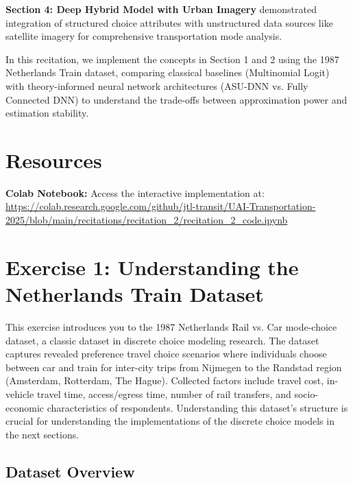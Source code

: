 \documentclass[11pt]{article}
\begin{document}
\textbf{Section 4: Deep Hybrid Model with Urban Imagery} demonstrated integration of structured choice attributes with unstructured data sources like satellite imagery for comprehensive transportation mode analysis.

In this recitation, we implement the concepts in Section 1 and 2 using the 1987 Netherlands Train dataset, comparing classical baselines (Multinomial Logit) with theory-informed neural network architectures (ASU-DNN vs. Fully Connected DNN) to understand the trade-offs between approximation power and estimation stability.

\section*{Resources}

\textbf{Colab Notebook:} Access the interactive implementation at:\\
\url{https://colab.research.google.com/github/jtl-transit/UAI-Transportation-2025/blob/main/recitations/recitation_2/recitation_2_code.ipynb}

\section*{Exercise 1: Understanding the Netherlands Train Dataset}

\begin{center}
\end{center}

This exercise introduces you to the 1987 Netherlands Rail vs. Car mode-choice dataset, a classic dataset in discrete choice modeling research. The dataset captures revealed preference travel choice scenarios where individuals choose between car and train for inter-city trips from Nijmegen to the Randstad region (Amsterdam, Rotterdam, The Hague). Collected factors include travel cost, in-vehicle travel time, access/egress time, number of rail transfers, and socio-economic characteristics of respondents. Understanding this dataset's structure is crucial for understanding the implementations of the discrete choice models in the next sections.

\subsection*{Dataset Overview}
\end{document}
